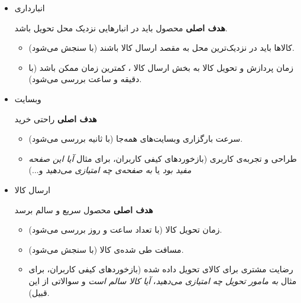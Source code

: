\documentclass[12pt, dvipsnames, svgnames, x11names,]{article}
\begin{document}
\begin{itemize}
    \item  انبارداری 
    
    \textbf{هدف اصلی} محصول باید در انبار‌هایی نزدیک محل تحویل باشد.
    \begin{itemize}
        \item 
        کالا‌ها باید در نزدیک‌ترین محل به مقصد ارسال کالا باشند (با سنجش می‌شود).
        
        \item 
        زمان پردازش و تحویل کالا به بخش ارسال کالا ، کمترین زمان ممکن باشد (با دقیقه و ساعت بررسی می‌شود).        
    \end{itemize}
    
    \item وبسایت  
    
    \textbf{هدف اصلی} راحتی خرید
    \begin{itemize}
        \item سرعت بارگزاری وبسایت‌های  همه‌جا (با ثانیه بررسی می‌شود).
        
        \item 
        طراحی و تجربه‌ی کاربری  (بازخورد‌های کیفی کاربران، برای مثال \textit{آیا این صفحه مفید بود} یا \textit{به صفحه‌ی  چه امتیازی می‌دهید} و...)
    \end{itemize}

    \item ارسال کالا 
    
    \textbf{هدف اصلی} محصول سریع و سالم برسد
    \begin{itemize}
        \item 
        زمان تحویل کالا (با تعداد ساعت و روز بررسی می‌شود).
        \item 
        مسافت طی شده‌ی کالا (با  سنجش می‌شود).
        
        \item 
        رضایت مشتری برای کالای تحویل داده شده (بازخورد‌های کیفی کاربران، برای مثال 
        \textit{به مامور تحویل چه امتیازی می‌دهید}،
        \textit{آیا کالا سالم است} و سوالاتی از این قبیل).
    \end{itemize}
\end{itemize}

\subsection{}
\end{document}
